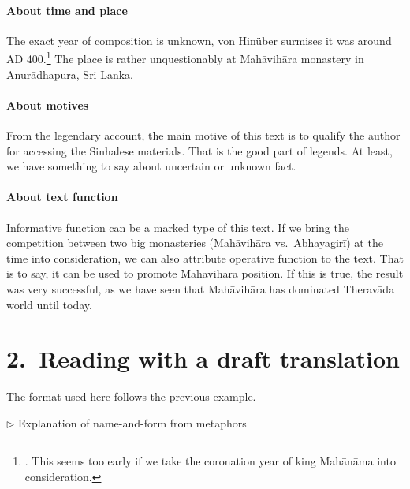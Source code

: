 \paragraph*{About time and place} The exact year of composition is unknown, von Hin\"uber surmises it was around AD 400.\footnote{\citealp[p.~126]{hinuber:literature}. This seems too early if we take the coronation year of king Mah\=an\=ama into consideration.} The place is rather unquestionably at Mah\=avih\=ara monastery in Anur\=adhapura, Sri Lanka.

\paragraph*{About motives} From the legendary account, the main motive of this text is to qualify the author for accessing the Sinhalese materials. That is the good part of legends. At least, we have something to say about uncertain or unknown fact.

\paragraph*{About text function} Informative function can be a marked type of this text. If we bring the competition between two big monasteries (Mah\=avih\=ara vs.\ Abhayagir\=i) at the time into consideration, we can also attribute operative function to the text. That is to say, it can be used to promote Mah\=avih\=ara position. If this is true, the result was very successful, as we have seen that Mah\=avih\=ara has dominated Therav\=ada world until today.

{}
\section*{2.\ Reading with a draft translation}

The format used here follows the previous example.

\bigskip
\begin{center}
\textbf{}\par
$\triangleright$ Explanation of name-and-form from metaphors
\end{center}

